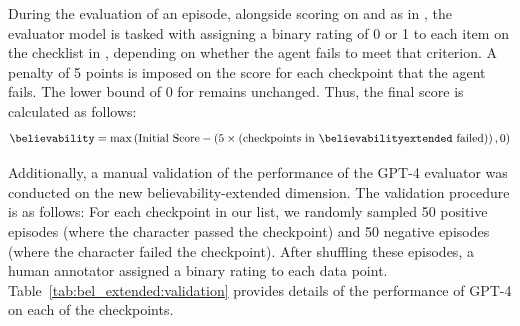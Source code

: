 During the evaluation of an episode, alongside scoring on \believability and \goalcompletion as in \sotopia, the evaluator model is tasked with assigning a binary rating of 0 or 1 to each item on the checklist in \believabilityextended, depending on whether the agent fails to meet that criterion. A penalty of 5 points is imposed on the \believability score for each checkpoint that the agent fails. The lower bound of 0 for \believability remains unchanged. Thus, the final \believability score is calculated as follows:
\begin{align}
    \text{\believability} = \max\left(\text{Initial Score} -\left(5 \times \text{(checkpoints in \believabilityextended failed)}\right), 0\right)
\end{align}

Additionally, a manual validation of the performance of the GPT-4 evaluator was conducted on the new believability-extended dimension. The validation procedure is as follows: For each checkpoint in our list, we randomly sampled 50 positive episodes (where the character passed the checkpoint) and 50 negative episodes (where the character failed the checkpoint). After shuffling these episodes, a human annotator assigned a binary rating to each data point. Table~\ref{tab:bel_extended:validation} provides details of the performance of GPT-4 on each of the checkpoints.


